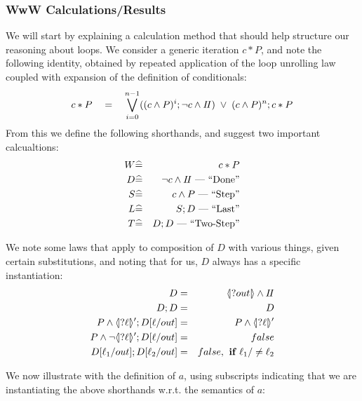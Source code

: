\subsubsection{WwW Calculations/Results}

We will start by explaining a calculation method
that should help structure our reasoning about loops.
We consider a generic iteration $c*P$,
and note the following identity,
obtained by repeated application of the loop unrolling law
coupled with expansion of the definition of conditionals:
\begin{equation}\label{eqn:unroll-n-times}
   c * P
   \quad=\quad
   \bigvee_{i=0}^{n-1} ( (c \land P)^i ; \lnot c \land I\!I)
   \;\lor\;
   (c \land P)^n ; c * P
\end{equation}
From this we define the following shorthands,
and suggest two important calcualtions:
\begin{eqnarray*}
   W &\widehat=& c * P
\\ D &\widehat=& \lnot c \land I\!I \textrm{ --- ``Done''}
\\ S &\widehat=& c \land P \textrm{ --- ``Step''}
\\ L &\widehat=& S ; D \textrm{ --- ``Last''}
\\ T &\widehat=& D ; D \textrm{ --- ``Two-Step''}
\end{eqnarray*}

We note some laws that apply to composition of $D$ with various
things, given certain substitutions, and noting that for us,
$D$ always has a specific instantiation:
\begin{eqnarray*}
   D &=& \LS{out} \land \Skip
\\ D ; D &= & D
\\ P \land \LSd{\ell} ; D[\ell/out] &=&  P \land \LSd{\ell}
\\ P \land \lnot\LSd{\ell} ; D[\ell/out] &=&  false
\\ D[\ell_1/out] ; D[\ell_2/out] &=& false,\textbf{ if }\ell_1/\neq\ell_2
\end{eqnarray*}

We now illustrate with the definition of $a$,
using subscripts indicating that we are instantiating the above shorthands
w.r.t. the semantics of $a$:

